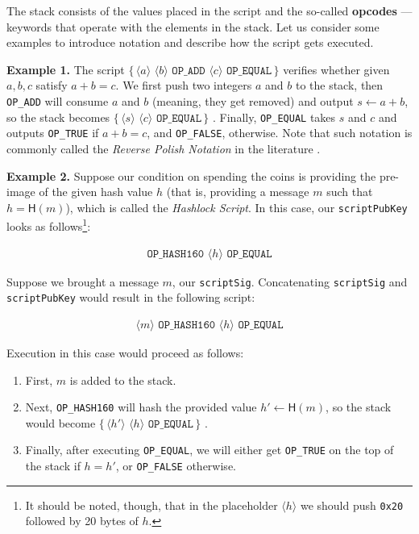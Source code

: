 \documentclass{iacrtrans}
\newcommand{\elem}[1]{\, \langle #1 \rangle \,}
\newcommand{\opcode}[1]{\, \texttt{#1} \,}
\newcommand{\script}[1]{ $\big\{ #1 \big\}$ }
\begin{document}
The stack consists of the values placed in the script and the so-called \textbf{opcodes} --- keywords that operate with the elements in the stack. Let us consider some examples to introduce notation and describe how the script gets executed. 

\textbf{Example 1.} The script \script{\elem{a} \elem{b} \opcode{OP\_ADD} \elem{c} \opcode{OP\_EQUAL}} verifies whether given $a,b,c$ satisfy $a+b=c$. We first push two integers $a$ and $b$ to the stack, then \texttt{OP\_ADD} will consume $a$ and $b$ (meaning, they get removed) and output $s \gets a+b$, so the stack becomes \script{\elem{s} \elem{c} \opcode{OP\_EQUAL}}. Finally, \texttt{OP\_EQUAL} takes $s$ and $c$ and outputs \texttt{OP\_TRUE} if $a+b=c$, and \texttt{OP\_FALSE}, otherwise. Note that such notation is commonly called the \textit{Reverse Polish Notation} in the literature \cite{reverse_polish_notation}.

\textbf{Example 2.} Suppose our condition on spending the coins is providing the pre-image of the given hash value $h$ (that is, providing a message $m$ such that $h = \mathsf{H}(m)$), which is called the \textit{Hashlock Script}. In this case, our \texttt{scriptPubKey} looks as follows\footnote{It should be noted, though, that in the placeholder $\langle h \rangle$ we should push \texttt{0x20} followed by 20 bytes of $h$.}:
\begin{empheqboxed}
\begin{align*}
    \opcode{OP\_HASH160} \elem{h} \opcode{OP\_EQUAL}
\end{align*}
\end{empheqboxed}

Suppose we brought a message $m$, our \texttt{scriptSig}. Concatenating \texttt{scriptSig} and \texttt{scriptPubKey} would result in the following script:
\begin{empheqboxed}
\begin{align*}
    \elem{m} \opcode{OP\_HASH160} \elem{h} \opcode{OP\_EQUAL}
\end{align*}
\end{empheqboxed}

Execution in this case would proceed as follows:
\begin{enumerate}
    \item First, $m$ is added to the stack.
    \item Next, \texttt{OP\_HASH160} will hash the provided value $h' \gets \mathsf{H}(m)$, so the stack would become \script{\elem{h'} \elem{h} \opcode{OP\_EQUAL}}.
    \item Finally, after executing \texttt{OP\_EQUAL}, we will either get \texttt{OP\_TRUE} on the top of the stack if $h = h'$, or \texttt{OP\_FALSE} otherwise. 
\end{enumerate}
\end{document}
